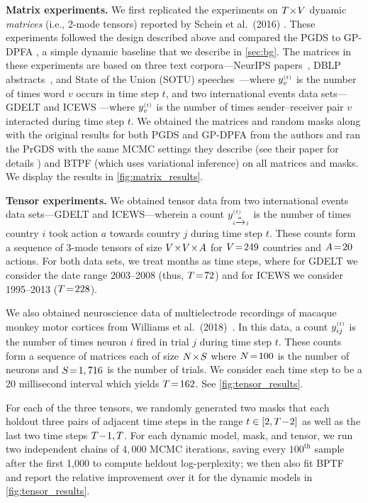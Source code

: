 \documentclass{article}
\begin{document}
\textbf{Matrix experiments.} We first replicated the experiments on $T\!\times\! V$ dynamic \emph{matrices} (i.e., 2-mode tensors) reported by Schein et al.~(2016) \cite{schein2016poisson}. These experiments followed the design described above and compared the PGDS to GP-DPFA \cite{acharya2015nonparametric}, a simple dynamic baseline that we describe in \cref{sec:bg}. The matrices in these experiments are based on three text corpora---NeurIPS papers~\cite{neuripscorpus}, DBLP abstracts~\cite{dblp}, and State of the Union (SOTU) speeches~\cite{sotu}---where $\yvt$ is the number of times word $v$ occurs in time step $t$, and two international events data sets---GDELT \cite{leetaru2013gdelt} and ICEWS \cite{boscheeicews}---where $\yvt$ is the number of times sender--receiver pair $v$ interacted during time step $t$. We obtained the matrices and random masks along with the original results for both PGDS and GP-DPFA from the authors and ran the PrGDS with the same MCMC settings they describe (see their paper for details \cite{schein2016poisson}) and BTPF (which uses variational inference) on all matrices and masks. We display the results in \cref{fig:matrix_results}.~

\textbf{Tensor experiments.} We obtained tensor data from two international events data sets---GDELT and ICEWS---wherein a count $y_{\mathsmaller{i \xrightarrow{a}j}}^{\mathsmaller{(t)}}$ is the number of times country $i$ took action $a$ towards country $j$ during time step $t$. These counts form a sequence of 3-mode tensors of size $V \!\times\! V \!\times\! A$ for $V \!=\! 249$ countries and $A \!=\! 20$ actions. For both data sets, we treat months as time steps, where for GDELT we consider the date range 2003--2008 (thus, $T \!=\! 72$) and for ICEWS we consider 1995--2013 ($T \!=\! 228$). 

We also obtained neuroscience data of multielectrode recordings of macaque monkey motor cortices from Williams et al.~(2018)~\cite{williams2018unsupervised}. In this data, a count $y^{\mathsmaller{(t)}}_{ij}$ is the number of times neuron $i$ fired in trial $j$ during time step $t$. These counts form a sequence of matrices each of size $N \!\times\! S$ where $N \!=\! 100$ is the number of neurons and $S \!=\! 1,716$ is the number of trials. We consider each time step to be a 20 millisecond interval which yields $T \!=\! 162$. See \cref{fig:tensor_results}. 

For each of the three tensors, we randomly generated two masks that each holdout three pairs of adjacent time steps in the range $t \in [2, T\!-\! 2]$ as well as the last two time steps $T\!-\! 1, T$. For each dynamic model, mask, and tensor, we run two independent chains of $4,000$ MCMC iterations, saving every $100^{\textrm{th}}$ sample after the first 1,000 to compute heldout log-perplexity; we then also fit BPTF and report the relative improvement over it for the dynamic models in \cref{fig:tensor_results}.
\end{document}
